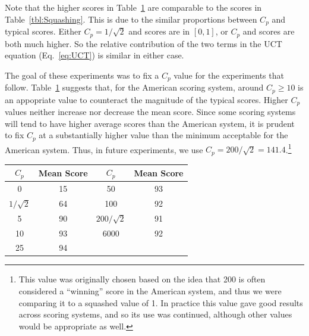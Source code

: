 \documentclass[letterpaper]{article}
\begin{document}
Note that the higher scores in Table~\ref{tbl:noSquashing} are comparable to the scores in Table~\ref{tbl:Squashing}. This is due to the similar proportions between $C_p$ and typical scores. Either $C_p  = 1 / \sqrt{2}$ and scores are in $[0,1]$, or $C_p$ and scores are both much higher. So the relative contribution of the two terms in the UCT equation (Eq.~\ref{eq:UCT}) is similar in either case.

The goal of these experiments was to fix a $C_p$ value for the experiments that follow. Table~\ref{tbl:noSquashing} suggests that, for the American scoring system, around $C_p \geq 10$ is an appopriate value to counteract the magnitude of the typical scores. Higher $C_p$ values neither increase nor decrease the mean score. Since some scoring systems will tend to have higher average scores than the American system, it is prudent to fix $C_p$ at a substantially higher value than the minimum acceptable for the American system. Thus, in future experiments, we use $C_p = 200 / \sqrt{2} = 141.4$.\footnote{This value was originally chosen based on the idea that 200 is often considered a ``winning'' score in the American system, and thus we were comparing it to a squashed value of 1. In practice this value gave good results across scoring systems, and so its use was continued, although other values would be appropriate as well.}


\begin{table}
\label{tbl:noSquashing}
\centering
\begin{tabular}{c c || c c}
\hline
{\bf $C_p$} & {\bf Mean Score} & {\bf $C_p$} & {\bf Mean Score} \\
\hline
0 & 15 &                                        50 & 93        \\
$1 / \sqrt{2}$ & 64 &                      100 & 92                       \\
5 & 90 &                                        $200 / \sqrt{2}$ & 91       \\
10 & 93 &                                      6000 & 92        \\
25 & 94 \\
\hline
\end{tabular}
\end{table}
\end{document}
